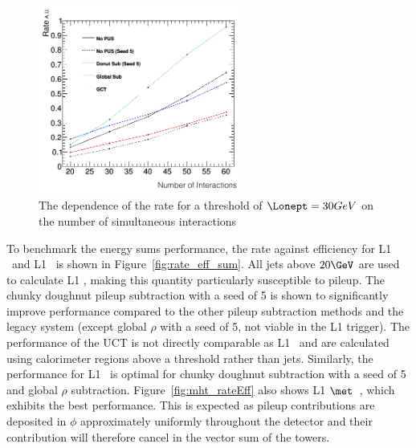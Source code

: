\begin{figure}
\centering
    \includegraphics[width=0.6\textwidth]{./Figures/triggerUpgrade/neutrinonvtx_jet1}
  \caption{The dependence of the rate for a threshold of $\Lonept=30GeV$ on the number of simultaneous interactions}
  \label{fig:rate_nvtx}
\end{figure}

To benchmark the energy sums performance, the rate against efficiency for L1 \scalht~and L1 \mht~is shown in Figure~\ref{fig:rate_eff_sum}.
All jets above $20 \GeV$ are used to calculate L1 \scalht, making this quantity particularly susceptible to pileup. The chunky doughnut 
pileup subtraction with a seed of 5 is shown to significantly improve performance compared to the other pileup subtraction
methods and the legacy system (except global $\rho$ with a seed of 5, not viable in the L1 trigger). The performance of the UCT is not 
directly comparable as L1 \scalht~and \mht are calculated using calorimeter regions above a threshold rather than jets. Similarly, the performance for 
L1 \mht~is optimal for chunky doughnut subtraction with a seed of 5 and global $\rho$ subtraction. 
Figure~\ref{fig:mht_rateEff} also shows L1 $\met$~, which exhibits the best performance. This is expected as 
pileup contributions are deposited in $\phi$ approximately uniformly throughout the detector and their contribution will
therefore cancel in the vector sum of the towers.

